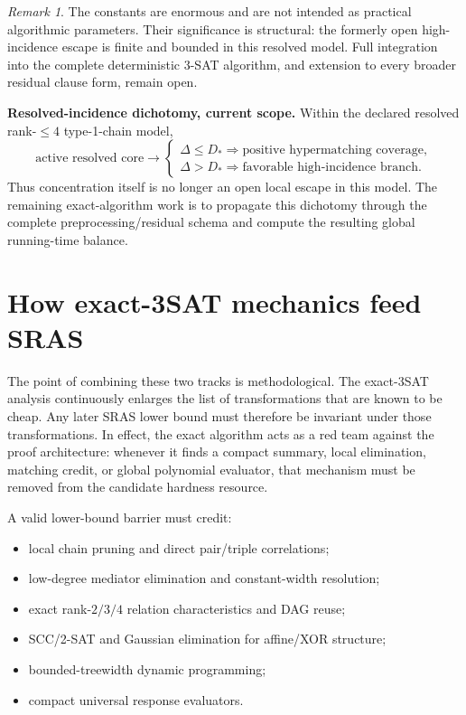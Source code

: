 \documentclass[11pt]{article}
\theoremstyle{plain}
\theoremstyle{definition}
\theoremstyle{remark}
\newtheorem{remark}[theorem]{Remark}
\begin{document}
\begin{remark}
The constants are enormous and are not intended as practical algorithmic
parameters.  Their significance is structural: the formerly open
high-incidence escape is finite and bounded in this resolved model.  Full
integration into the complete deterministic 3-SAT algorithm, and extension to
every broader residual clause form, remain open.
\end{remark}

\begin{provedbox}
\textbf{Resolved-incidence dichotomy, current scope.}
Within the declared resolved rank-$\le4$ type-1-chain model,
\[
\boxed{
\text{active resolved core}
\to
\begin{cases}
\Delta\le D_* \Rightarrow \text{positive hypermatching coverage},\\
\Delta>D_* \Rightarrow \text{favorable high-incidence branch}.
\end{cases}
}
\]
Thus concentration itself is no longer an open local escape in this model.
The remaining exact-algorithm work is to propagate this dichotomy through the
complete preprocessing/residual schema and compute the resulting global
running-time balance.
\end{provedbox}

\section{How exact-3SAT mechanics feed SRAS}

The point of combining these two tracks is methodological. The exact-3SAT
analysis continuously enlarges the list of transformations that are known to
be cheap. Any later SRAS lower bound must therefore be invariant under those
transformations. In effect, the exact algorithm acts as a red team against the
proof architecture: whenever it finds a compact summary, local elimination,
matching credit, or global polynomial evaluator, that mechanism must be
removed from the candidate hardness resource.

A valid lower-bound barrier must credit:
\begin{itemize}[leftmargin=1.4em]
\item local chain pruning and direct pair/triple correlations;
\item low-degree mediator elimination and constant-width resolution;
\item exact rank-$2/3/4$ relation characteristics and DAG reuse;
\item SCC/2-SAT and Gaussian elimination for affine/XOR structure;
\item bounded-treewidth dynamic programming;
\item compact universal response evaluators.
\end{itemize}
\end{document}
